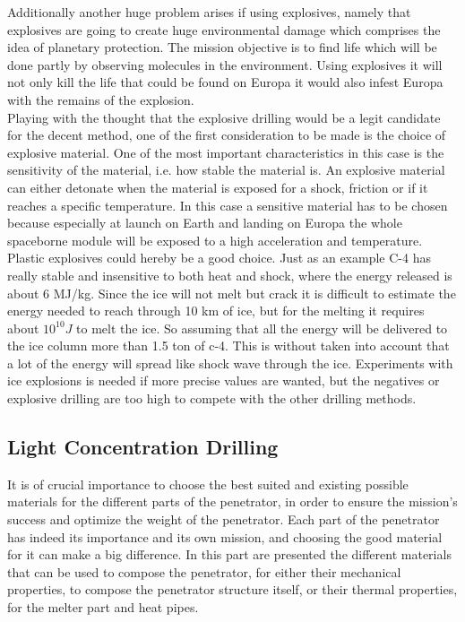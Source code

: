 \noindent
Additionally another huge problem arises if using explosives, namely that explosives are going to create huge environmental damage which comprises the idea of planetary protection. The mission objective is to find life which will be done partly by observing molecules in the environment. Using explosives it will not only kill the life that could be found on Europa it would also infest Europa with the remains of the explosion.\\

\noindent
Playing with the thought that the explosive drilling would be a legit candidate for the decent method, one of the first consideration to be made is the choice of explosive material. One of the most important characteristics in this case is the sensitivity of the material, i.e. how stable the material is. An explosive material can either detonate when the material is exposed for a shock, friction or if it reaches a specific temperature. In this case a sensitive material has to be chosen because especially at launch on Earth and landing on Europa the whole spaceborne module will be exposed to a high acceleration and temperature. Plastic explosives could hereby be a good choice. Just as an example C-4 has really stable and insensitive to both heat and shock, where the energy released is about 6 MJ/kg. Since the ice will not melt but crack it is difficult to estimate the energy needed to reach through 10 km of ice, but for the melting it requires about $10^{10}J$ to melt the ice. So assuming that all the energy will be delivered to the ice column more than 1.5 ton of c-4. This is without taken into account that a lot of the energy will spread like shock wave through the ice. Experiments with ice explosions is needed if more precise values are wanted, but the negatives or explosive drilling are too high to compete with the other drilling methods.





\subsection{Light Concentration Drilling}






It is of crucial importance to choose the best suited and existing possible materials for the different parts of the penetrator, in order to ensure the mission's success and optimize the weight of the penetrator. Each part of the penetrator has indeed its importance and its own mission, and choosing the good material for it can make a big difference. In this part are presented the different materials that can be used to compose the penetrator, for either their mechanical properties, to compose the penetrator structure itself, or their thermal properties, for the melter part and heat pipes.

